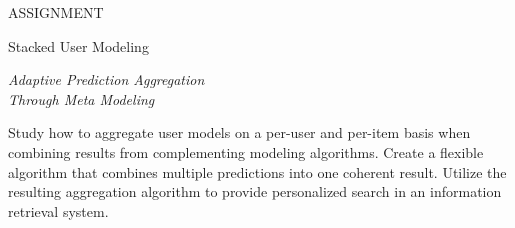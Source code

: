 \null\vspace{6em}

{
  \centering
  \color{gray}
  ASSIGNMENT
  \color{black}
  \vspace{1em}
  
  \LARGE{Stacked User Modeling}\\
  \vspace{1em}
  
  \itshape
  \large{Adaptive Prediction Aggregation}\\
  \large{Through Meta Modeling}\\
}

\vspace{3em}

Study how to aggregate user models on a per-user and per-item
basis when combining results from complementing modeling algorithms.
Create a flexible algorithm that combines multiple predictions
into one coherent result.
Utilize the resulting aggregation algorithm
to provide personalized search in an information retrieval system.

\vfill

